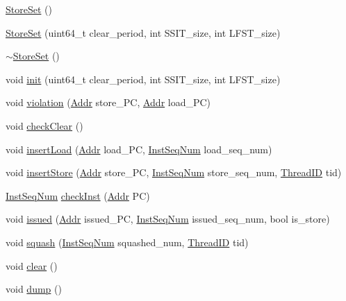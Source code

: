 \begin{DoxyCompactItemize}
\item 
\hyperlink{classStoreSet_ab4658accf641bb529cfd0d8a86ac1985}{StoreSet} ()
\item 
\hyperlink{classStoreSet_a31e067a1c435ba8158c230dfe3348839}{StoreSet} (uint64\_\-t clear\_\-period, int SSIT\_\-size, int LFST\_\-size)
\item 
\hyperlink{classStoreSet_a7e8dc54e3df2141367927871901e6152}{$\sim$StoreSet} ()
\item 
void \hyperlink{classStoreSet_a4976b4794b30eada21534d7238044c68}{init} (uint64\_\-t clear\_\-period, int SSIT\_\-size, int LFST\_\-size)
\item 
void \hyperlink{classStoreSet_a28e9d2d8a7a8df645736800101f56517}{violation} (\hyperlink{base_2types_8hh_af1bb03d6a4ee096394a6749f0a169232}{Addr} store\_\-PC, \hyperlink{base_2types_8hh_af1bb03d6a4ee096394a6749f0a169232}{Addr} load\_\-PC)
\item 
void \hyperlink{classStoreSet_a4dab67311167cad2367beac85376a3bc}{checkClear} ()
\item 
void \hyperlink{classStoreSet_a205cc846bfa1f976cf2ca9f4bd0fd226}{insertLoad} (\hyperlink{base_2types_8hh_af1bb03d6a4ee096394a6749f0a169232}{Addr} load\_\-PC, \hyperlink{inst__seq_8hh_a258d93d98edaedee089435c19ea2ea2e}{InstSeqNum} load\_\-seq\_\-num)
\item 
void \hyperlink{classStoreSet_ab879063d4bfe2e1c91025715007bfecb}{insertStore} (\hyperlink{base_2types_8hh_af1bb03d6a4ee096394a6749f0a169232}{Addr} store\_\-PC, \hyperlink{inst__seq_8hh_a258d93d98edaedee089435c19ea2ea2e}{InstSeqNum} store\_\-seq\_\-num, \hyperlink{base_2types_8hh_ab39b1a4f9dad884694c7a74ed69e6a6b}{ThreadID} tid)
\item 
\hyperlink{inst__seq_8hh_a258d93d98edaedee089435c19ea2ea2e}{InstSeqNum} \hyperlink{classStoreSet_ae8d309615668a58409f29cc73457c7c9}{checkInst} (\hyperlink{base_2types_8hh_af1bb03d6a4ee096394a6749f0a169232}{Addr} PC)
\item 
void \hyperlink{classStoreSet_a2c9204930bc1f40dfe7451a29a6b8d8d}{issued} (\hyperlink{base_2types_8hh_af1bb03d6a4ee096394a6749f0a169232}{Addr} issued\_\-PC, \hyperlink{inst__seq_8hh_a258d93d98edaedee089435c19ea2ea2e}{InstSeqNum} issued\_\-seq\_\-num, bool is\_\-store)
\item 
void \hyperlink{classStoreSet_a7ff20e53cb9b14b1794a656def08f910}{squash} (\hyperlink{inst__seq_8hh_a258d93d98edaedee089435c19ea2ea2e}{InstSeqNum} squashed\_\-num, \hyperlink{base_2types_8hh_ab39b1a4f9dad884694c7a74ed69e6a6b}{ThreadID} tid)
\item 
void \hyperlink{classStoreSet_ac8bb3912a3ce86b15842e79d0b421204}{clear} ()
\item 
void \hyperlink{classStoreSet_accd2600060dbaee3a3b41aed4034c63c}{dump} ()
\end{DoxyCompactItemize}
